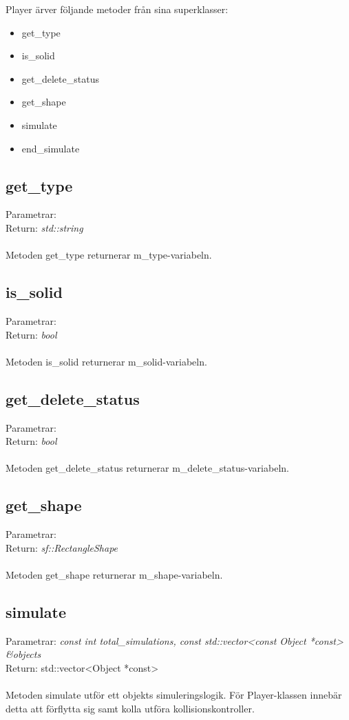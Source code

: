 \documentclass{TDP003mall}
\begin{document}
Player ärver följande metoder från sina superklasser:
\begin{itemize}
\item get\_type
\item is\_solid
\item get\_delete\_status
\item get\_shape
\item simulate
\item end\_simulate
\end{itemize}

\subsection{get\_type}
Parametrar: \textit{}
\\Return: \textit{std::string}
\\\\
Metoden get\_type returnerar m\_type-variabeln.

\subsection{is\_solid}
Parametrar: \textit{}
\\Return: \textit{bool}
\\\\
Metoden is\_solid returnerar m\_solid-variabeln.

\subsection{get\_delete\_status}
Parametrar: \textit{}
\\Return: \textit{bool}
\\\\
Metoden get\_delete\_status returnerar m\_delete\_status-variabeln.

\subsection{get\_shape}
Parametrar: \textit{}
\\Return: \textit{sf::RectangleShape}
\\\\
Metoden get\_shape returnerar m\_shape-variabeln.

\subsection{simulate}
Parametrar: \textit{const int total\_simulations, const std::vector<const Object *const> \&objects}
\\Return: std::vector<Object *const>
\\\\
Metoden simulate utför ett objekts simuleringslogik. För Player-klassen innebär detta att förflytta sig samt kolla utföra kollisionskontroller.
\end{document}
